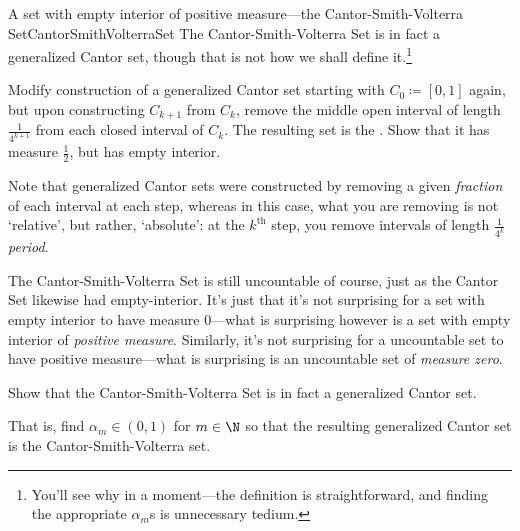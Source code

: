 \begin{exm}{A set with empty interior of positive measure---the Cantor-Smith-Volterra Set}{CantorSmithVolterraSet}
The Cantor-Smith-Volterra Set is in fact a generalized Cantor set, though that is not how we shall define it.\footnote{You'll see why in a moment---the definition is straightforward, and finding the appropriate $\alpha _m$s is unnecessary tedium.}
\begin{exr}[breakable=false]{}{}
Modify construction of a generalized Cantor set starting with $C_0\coloneqq [0,1]$ again, but upon constructing $C_{k+1}$ from $C_k$, remove the middle open interval of length $\frac{1}{4^{k+1}}$ from each closed interval of $C_k$.  The resulting set is the .  Show that it has measure $\frac{1}{2}$, but has empty interior.
\end{exr}
\begin{rmk}
Note that generalized Cantor sets were constructed by removing a given \emph{fraction} of each interval at each step, whereas in this case, what you are removing is not `relative', but rather, `absolute':  at the $k^{\text{th}}$ step, you remove intervals of length $\frac{1}{4^k}$ \emph{period}.
\end{rmk}
\begin{rmk}
The Cantor-Smith-Volterra Set is still uncountable of course, just as the Cantor Set likewise had empty-interior.  It's just that it's not surprising for a set with empty interior to have measure $0$---what is surprising however is a set with empty interior of \emph{positive measure}.  Similarly, it's not surprising for a uncountable set to have positive measure---what is surprising is an uncountable set of \emph{measure zero}.
\end{rmk}
\begin{exr}[breakable=false]{}{}
Show that the Cantor-Smith-Volterra Set is in fact a generalized Cantor set.
\begin{rmk}
That is, find $\alpha _m\in (0,1)$ for $m\in \N$ so that the resulting generalized Cantor set is the Cantor-Smith-Volterra set.
\end{rmk}
\end{exr}
\end{exm}

\horizontalrule

